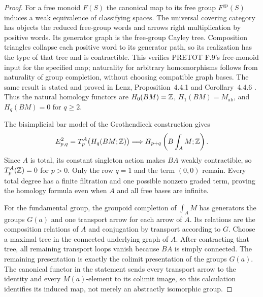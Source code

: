 \begin{proof}
For a free monoid $F(S)$ the canonical map to its free group
$F^{\mathrm{gp}}(S)$ induces a weak equivalence of classifying
spaces. The universal covering category has objects the reduced
free-group words and arrows right multiplication by positive words.
Its generator graph is the free-group Cayley tree. Composition
triangles collapse each positive word to its generator path, so
its realization has the type of that tree and is contractible.
This verifies PRETOT F.9's free-monoid input for the specified
map; naturality for arbitrary homomorphisms follows from
naturality of group completion, without choosing compatible graph
bases. The same result is stated and proved in Lenz,
Proposition~4.4.1 and Corollary~4.4.6 \cite{CDLenz2011}.
Thus the natural homology functors are $H_0(BM)=\mathbb Z$,
$H_1(BM)=M_{\mathrm{ab}}$, and $H_q(BM)=0$ for $q\geq2$.

The bisimplicial bar model of the Grothendieck construction gives
\[
 E^2_{p,q}=T_p^A\bigl(H_q(BM;\mathbb Z)\bigr)
       \Longrightarrow H_{p+q}\left(B\int_A M;\mathbb Z\right).
\]
Since $A$ is total, its constant singleton action makes $BA$
weakly contractible, so $T_p^A(\mathbb Z)=0$ for $p>0$.
Only the row $q=1$ and the term $(0,0)$ remain. Every total degree
has a finite filtration and one possible nonzero graded term,
proving the homology formula even when $A$ and all free bases are
infinite.

For the fundamental group, the groupoid completion of $\int_A M$
has generators the groups $G(a)$ and one transport arrow for
each arrow of $A$. Its relations are the composition relations
of $A$ and conjugation by transport according to $G$.
Choose a maximal tree in the connected underlying graph of $A$.
After contracting that tree, all remaining transport loops vanish
because $BA$ is simply connected. The remaining presentation is
exactly the colimit presentation of the groups $G(a)$. The
canonical functor in the statement sends every transport arrow
to the identity and every $M(a)$-element to its colimit image,
so this calculation identifies its induced map, not merely an
abstractly isomorphic group.
\end{proof}


